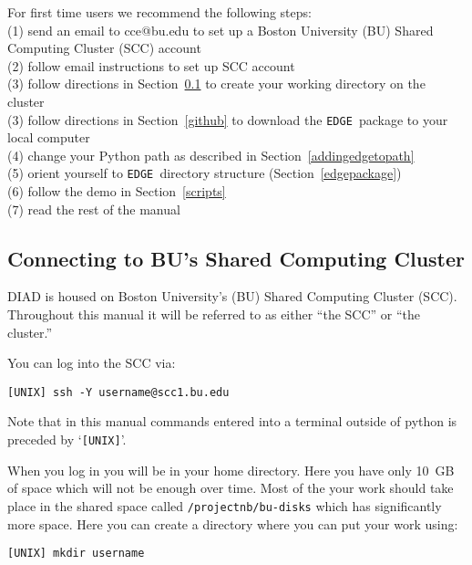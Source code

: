 \documentclass{article}
\newcommand{\edge}{\texttt{EDGE }}
\begin{document}
\noindent For first time users we recommend the following steps:\\
(1) send an email to cce@bu.edu to set up a Boston University (BU) Shared Computing Cluster (SCC) account \\
(2) follow email instructions to set up SCC account \\
(3) follow directions in Section~\ref{scc} to create your working directory on the cluster \\
(3) follow directions in Section~\ref{github} to download the \edge package to your local computer \\
(4) change your Python path as described in Section~\ref{addingedgetopath}  \\
(5) orient yourself to \edge directory structure (Section~\ref{edgepackage})\\
(6) follow the demo in Section~\ref{scripts} \\
(7) read the rest of the manual

\subsection{Connecting to BU's Shared Computing Cluster} \label{scc}

DIAD is housed on Boston University's (BU) Shared Computing Cluster (SCC).  Throughout this
manual it will be referred to as either ``the SCC'' or ``the cluster.''

\vspace{2mm}

\noindent You can log into the SCC via:

\vspace{2mm}
\texttt{[UNIX] ssh -Y username@scc1.bu.edu}
\vspace{2mm}

\noindent Note that in this manual commands entered into a terminal outside of python is preceded by `\texttt{[UNIX]}'.

\vspace{2mm}

\noindent When you log in you will be in your home directory.  Here you have only 10~GB of space which will not be enough over time. Most of the your work should take place in the shared space called \texttt{/projectnb/bu-disks} which has significantly more space.  Here you can create a directory where you can put your work using:

\vspace{2mm}
\texttt{[UNIX] mkdir username}
\vspace{2mm}
\end{document}
